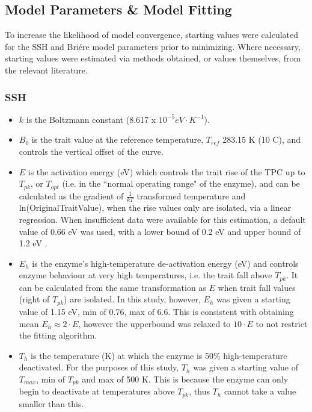 \documentclass[11pt]{article}
\begin{document}
        \subsection{Model Parameters \& Model Fitting}
            To increase the likelihood of model convergence, starting values were calculated for the SSH and Bri\'ere model parameters prior to minimizing. Where necessary, starting values were estimated via methods obtained, or values themselves, from the relevant literature. 
            \subsubsection{SSH}
                \begin{itemize}
                    \item $k$ is the Boltzmann constant (8.617 x $10^{−5} eV \cdot K^{-1}$).
                    \item $B_0$ is the trait value at the reference temperature, $T_{ref}$ 283.15 K (10 \degree C), and controls the vertical offset of the curve.
                    \item $E$ is the activation energy (eV) which controls the trait rise of the TPC up to $T_{pk}$, or $T_{opt}$ (i.e. in the ``normal operating range" of the enzyme), and can be calculated as the gradient of $\frac{1}{kT}$ transformed temperature and ln(OriginalTraitValue), when the rise values only are isolated, via a linear regression. When insufficient data were available for this estimation, a default value of 0.66 eV was used, with a lower bound of 0.2 eV and upper bound of 1.2 eV .
                    \item $E_h$ is the enzyme's high-temperature de-activation energy (eV) and controls enzyme behaviour at very high temperatures, i.e. the trait fall above $T_{pk}$. It can be calculated from the same transformation as $E$ when trait fall values (right of $T_{pk}$) are isolated. In this study, however, $E_h$ was given a starting value of 1.15 eV, min of 0.76, max of 6.6. This is consistent with  obtaining mean $E_h \approx 2 \cdot E$, however the upperbound was relaxed to $10 \cdot E$ to not restrict the fitting algorithm.
                    \item $T_h$ is the temperature (K) at which the enzyme is 50\% high-temperature deactivated. For the purposes of this study, $T_h$ was given a starting value of $T_{max}$, min of $T_{pk}$ and max of 500 K. This is because the enzyme can only begin to deactivate at temperatures above $T_{pk}$, thus $T_h$ cannot take a value smaller than this.
                \end{itemize}
\end{document}
